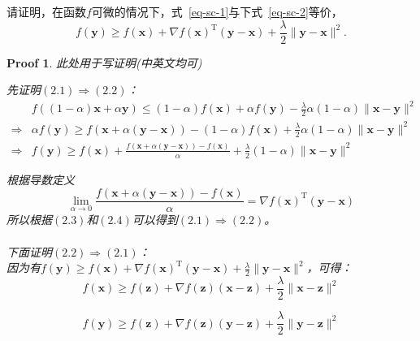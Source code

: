 \documentclass[a4paper,UTF8]{article}
\numberwithin{equation}{section}
\newtheorem*{myProof}{Proof}
\begin{document}
请证明，在函数$f$可微的情况下，式~\eqref{eq-sc-1}与下式~\eqref{eq-sc-2}等价，
\begin{equation}
  \label{eq-sc-2}
  f(\mathbf{y}) \geq f(\mathbf{x}) + \nabla f(\mathbf{x})^\mathrm{T}(\mathbf{y}-\mathbf{x}) + \frac{\lambda}{2}\lVert \mathbf{y} - \mathbf{x}\rVert^2.
\end{equation}
\begin{myProof}
此处用于写证明(中英文均可)

先证明$(2.1) \Rightarrow (2.2)$：
\begin{equation}
\begin{aligned}
&f((1-\alpha)\mathbf{x} + \alpha\mathbf{y})\leq (1-\alpha)f(\mathbf{x}) + \alpha f(\mathbf{y}) - \frac{\lambda}{2}\alpha(1-\alpha)\lVert \mathbf{x} - \mathbf{y}\rVert^2\\
\Rightarrow &\alpha f(\mathbf{y}) \geq f(\mathbf{x}+\alpha(\mathbf{y}-\mathbf{x})) - (1-\alpha)f(\mathbf{x}) + \frac{\lambda}{2}\alpha(1-\alpha)\lVert \mathbf{x} - \mathbf{y}\rVert^2\\
\Rightarrow & f(\mathbf{y}) \geq f(\mathbf{x}) + \frac{f(\mathbf{x} + \alpha(\mathbf{y}-\mathbf{x}))-f(\mathbf{x})}{\alpha} + \frac{\lambda}{2}(1-\alpha)\lVert \mathbf{x} - \mathbf{y}\rVert^2
\end{aligned}
\end{equation}

根据导数定义
\begin{equation}
\lim\limits_{\alpha\rightarrow 0}\frac{f(\mathbf{x} + \alpha(\mathbf{y}-\mathbf{x}))-f(\mathbf{x})}{\alpha} = \nabla f(\mathbf{x})^\mathrm{T}(\mathbf{y}-\mathbf{x})	
\end{equation}
所以根据$(2.3)$和$(2.4)$可以得到$(2.1) \Rightarrow (2.2)$。\\\\
下面证明$(2.2) \Rightarrow (2.1)$：\\
因为有$f(\mathbf{y}) \geq f(\mathbf{x}) + \nabla f(\mathbf{x})^\mathrm{T}(\mathbf{y}-\mathbf{x}) + \frac{\lambda}{2}\lVert \mathbf{y} - \mathbf{x}\rVert^2$，可得：
\begin{equation}
f(\mathbf{x}) \geq f(\mathbf{z}) + \nabla f(\mathbf{z})(\mathbf{x}-\mathbf{z}) + \frac{\lambda}{2}\lVert \mathbf{x} - \mathbf{z}\rVert^2
\end{equation}

\begin{equation}
f(\mathbf{y}) \geq f(\mathbf{z}) + \nabla f(\mathbf{z})(\mathbf{y}-\mathbf{z}) + \frac{\lambda}{2}\lVert \mathbf{y} - \mathbf{z}\rVert^2
\end{equation}


\end{myProof}
\end{document}
